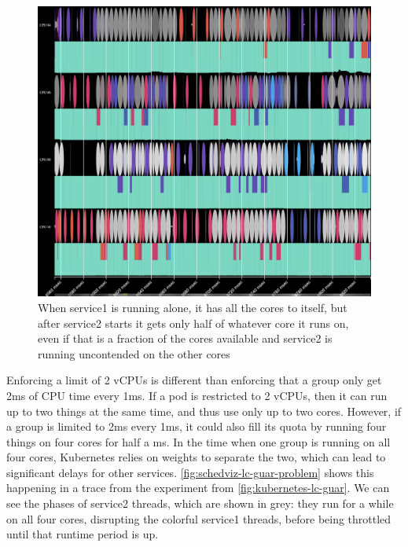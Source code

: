 \begin{figure}[t]
    \centering
    \includegraphics[width=\columnwidth]{graphs/schedviz-lc-guar-problem.png}
    \caption{When service1 is running alone, it has all the cores to itself, but
    after service2 starts it gets only half of whatever core it runs on, even if
    that is a fraction of the cores available and service2 is running uncontended
    on the other cores}\label{fig:schedviz-lc-guar-problem}
\end{figure}

Enforcing a limit of 2 vCPUs is different than enforcing that a group only get
2ms of CPU time every 1ms. If a pod is restricted to 2 vCPUs, then it can run up
to two things at the same time, and thus use only up to two cores. However, if a
group is limited to 2ms every 1ms, it could also fill its quota by running four
things on four cores for half a ms. In the time when one group is running on all
four cores, Kubernetes relies on weights to separate the two, which can lead to
significant delays for other services. \autoref{fig:schedviz-lc-guar-problem}
shows this happening in a trace from the experiment from
\autoref{fig:kubernetes-lc-guar}. We can see the phases of service2 threads,
which are shown in grey: they run for a while on all four cores, disrupting the
colorful service1 threads, before being throttled until that runtime period is
up.


